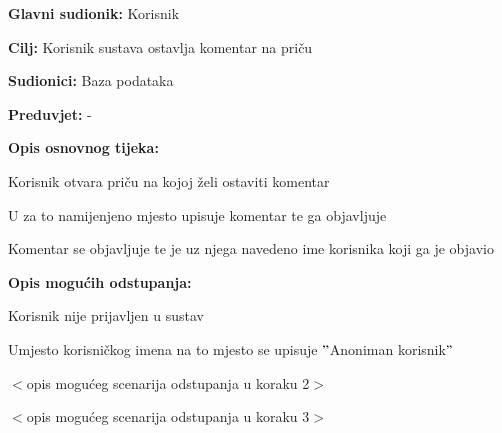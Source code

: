 						\noindent {}
					\begin{packed_item}
						
						\item \textbf{Glavni sudionik: }Korisnik
						\item  \textbf{Cilj:} Korisnik sustava ostavlja komentar na priču 
						\item  \textbf{Sudionici:} Baza podataka
						\item  \textbf{Preduvjet:} -
						\item  \textbf{Opis osnovnog tijeka:}
						
						\item[] \begin{packed_enum}
							\item Korisnik otvara priču na kojoj želi ostaviti komentar
							\item U za to namijenjeno mjesto upisuje komentar te ga objavljuje
							\item Komentar se objavljuje te je uz njega navedeno ime korisnika koji ga je objavio
							\item 
						\end{packed_enum}
						
						\item  \textbf{Opis mogućih odstupanja:}
						
						\item[] \begin{packed_item}
							
							\item[3.a] Korisnik nije prijavljen u sustav
							\item[] \begin{packed_enum}
								
								\item Umjesto korisničkog imena na to mjesto se upisuje $"$Anoniman korisnik$"$
								
							\end{packed_enum}
							\item[2.b] $<$opis mogućeg scenarija odstupanja u koraku 2$>$
							\item[3.a] $<$opis mogućeg scenarija odstupanja  u koraku 3$>$
							
						\end{packed_item}
					\end{packed_item}
				
